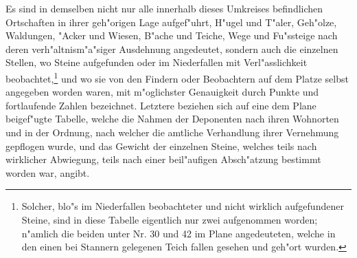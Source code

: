 \documentclass[a4paper, 11pt, oneside, german]{article}
\begin{document}
Es sind in demselben nicht nur alle innerhalb dieses Umkreises befindlichen Ortschaften in ihrer geh"origen Lage aufgef"uhrt, H"ugel und T"aler, Geh"olze, Waldungen, "Acker und Wiesen, B"ache und Teiche, Wege und Fu"ssteige nach deren verh"altnism"a"siger Ausdehnung angedeutet, sondern auch die einzelnen Stellen, wo Steine aufgefunden oder im Niederfallen mit Verl"asslichkeit beobachtet,\footnote{Solcher, blo"s im Niederfallen beobachteter und nicht wirklich aufgefundener Steine, sind in diese Tabelle eigentlich nur zwei aufgenommen worden; n"amlich die beiden unter Nr. 30 und 42 im Plane angedeuteten, welche in den einen bei Stannern gelegenen Teich fallen gesehen und geh"ort wurden.} und wo sie von den Findern oder Beobachtern auf dem Platze selbst angegeben worden waren, mit m"oglichster Genauigkeit durch Punkte und fortlaufende Zahlen bezeichnet. Letztere beziehen sich auf eine dem Plane beigef"ugte Tabelle, welche die Nahmen der Deponenten nach ihren Wohnorten und in der Ordnung, nach welcher die amtliche Verhandlung ihrer Vernehmung gepflogen wurde, und das Gewicht der einzelnen Steine, welches teils nach wirklicher Abwiegung, teils nach einer beil"aufigen Absch"atzung bestimmt worden war, angibt.
\end{document}
